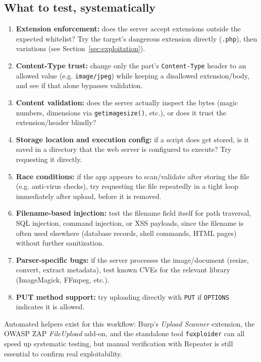 \documentclass[11pt]{article}
\begin{document}
\subsection{What to test, systematically}
\begin{enumerate}[leftmargin=1.4em]
    \item \textbf{Extension enforcement:} does the server accept extensions outside the expected whitelist? Try the target's dangerous extension directly (\texttt{.php}), then variations (see Section~\ref{sec:exploitation}).
    \item \textbf{Content-Type trust:} change only the part's \texttt{Content-Type} header to an allowed value (e.g. \texttt{image/jpeg}) while keeping a disallowed extension/body, and see if that alone bypasses validation.
    \item \textbf{Content validation:} does the server actually inspect the bytes (magic numbers, dimensions via \texttt{getimagesize()}, etc.), or does it trust the extension/header blindly?
    \item \textbf{Storage location and execution config:} if a script does get stored, is it saved in a directory that the web server is configured to execute? Try requesting it directly.
    \item \textbf{Race conditions:} if the app appears to scan/validate after storing the file (e.g. anti-virus checks), try requesting the file repeatedly in a tight loop immediately after upload, before it is removed.
    \item \textbf{Filename-based injection:} test the filename field itself for path traversal, SQL injection, command injection, or XSS payloads, since the filename is often used elsewhere (database records, shell commands, HTML pages) without further sanitization.
    \item \textbf{Parser-specific bugs:} if the server processes the image/document (resize, convert, extract metadata), test known CVEs for the relevant library (ImageMagick, FFmpeg, etc.).
    \item \textbf{PUT method support:} try uploading directly with \texttt{PUT} if \texttt{OPTIONS} indicates it is allowed.
\end{enumerate}

\begin{note}
Automated helpers exist for this workflow: Burp's \emph{Upload Scanner} extension, the OWASP ZAP \emph{FileUpload} add-on, and the standalone tool \texttt{fuxploider} can all speed up systematic testing, but manual verification with Repeater is still essential to confirm real exploitability.
\end{note}
\end{document}
